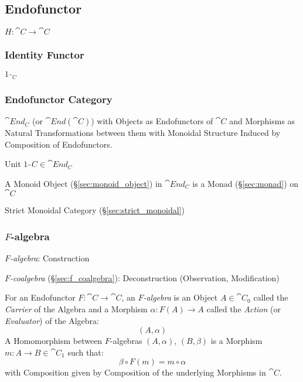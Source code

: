 \subsection{Endofunctor}\label{sec:endofunctor}

$H : \cat{C} \rightarrow \cat{C}$



\subsubsection{Identity Functor}\label{sec:identity_functor}

$1_{\cat{C}}$



\subsubsection{Endofunctor Category}\label{sec:endofunctor_category}

$\cat{End_C}$ (or $\cat{End}(\cat{C})$) with Objects as
Endofunctors of $\cat{C}$ and Morphisms as Natural Transformations
between them with Monoidal Structure Induced by Composition of
Endofunctors.

Unit $1_\cat{C} \in \cat{End_C}$

A Monoid Object (\S\ref{sec:monoid_object}) in $\cat{End_C}$ is a
Monad (\S\ref{sec:monad}) on $\cat{C}$

Strict Monoidal Category (\S\ref{sec:strict_monoidal})



\subsubsection{$F$-algebra}\label{sec:f_algebra}

\emph{$F$-algebra}: Construction

\emph{$F$-coalgebra} (\S\ref{sec:f_coalgebra}): Deconstruction
(Observation, Modification)

For an Endofunctor $F : \cat{C} \rightarrow \cat{C}$, an
\emph{$F$-algebra} is an Object $A \in \cat{C}_0$ called the
\emph{Carrier} of the Algebra and a Morphism $\alpha : F (A)
\rightarrow A$ called the \emph{Action} (or \emph{Evaluator}) of the
Algebra: \cite{corfield08}
\[
  (A,\alpha)
\]
A Homomorphism between $F$-algebras $(A,\alpha)$, $(B,\beta)$ is a
Morphism $m : A \rightarrow B \in \cat{C}_1$ such that:
\[
  \beta \circ F(m) = m \circ \alpha
\]
with Composition given by Composition of the underlying Morphisms in
$\cat{C}$.

